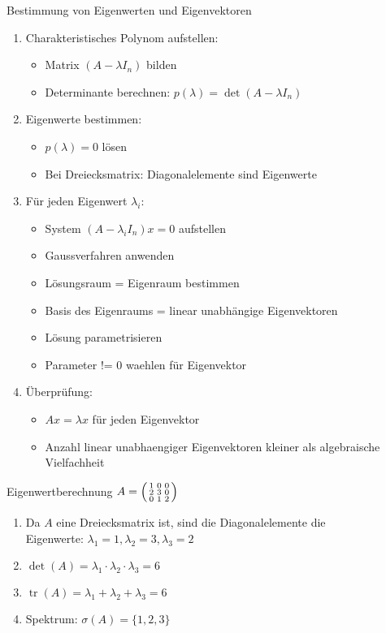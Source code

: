 \begin{KR}{Bestimmung von Eigenwerten und Eigenvektoren}
\begin{enumerate}
    \item Charakteristisches Polynom aufstellen: 
    \begin{itemize}
        \item Matrix $(A-\lambda I_n)$ bilden
        \item Determinante berechnen: $p(\lambda) = \det(A-\lambda I_n)$
    \end{itemize}
    \item Eigenwerte bestimmen:
    \begin{itemize}
        \item $p(\lambda) = 0$ lösen
        \item Bei Dreiecksmatrix: Diagonalelemente sind Eigenwerte
    \end{itemize}
    \item Für jeden Eigenwert $\lambda_i$:
    \begin{itemize}
        \item System $(A-\lambda_i I_n)x = 0$ aufstellen
        \item Gaussverfahren anwenden 
        \item Lösungsraum = Eigenraum bestimmen
        \item Basis des Eigenraums = linear unabhängige Eigenvektoren
        \item Lösung parametrisieren
        \item Parameter != 0 waehlen für Eigenvektor
    \end{itemize}
    \item Überprüfung:
    \begin{itemize}
        \item $Ax = \lambda x$ für jeden Eigenvektor
        \item Anzahl linear unabhaengiger Eigenvektoren kleiner als algebraische Vielfachheit
    \end{itemize}
\end{enumerate}
\end{KR}

\begin{example2}{Eigenwertberechnung}
$A = \begin{psmallmatrix} 1 & 0 & 0\\ 2 & 3 & 0\\ 0 & 1 & 2\end{psmallmatrix}$
\begin{enumerate}
    \item Da $A$ eine Dreiecksmatrix ist, sind die Diagonalelemente die \\
    Eigenwerte:
    $\lambda_1 = 1, \lambda_2 = 3, \lambda_3 = 2$
    \item $\det(A) = \lambda_1\cdot\lambda_2\cdot\lambda_3 = 6$
    \item $\operatorname{tr}(A) = \lambda_1 + \lambda_2 + \lambda_3 = 6$
    \item Spektrum: $\sigma(A) = \{1,2,3\}$
\end{enumerate}
\end{example2}

